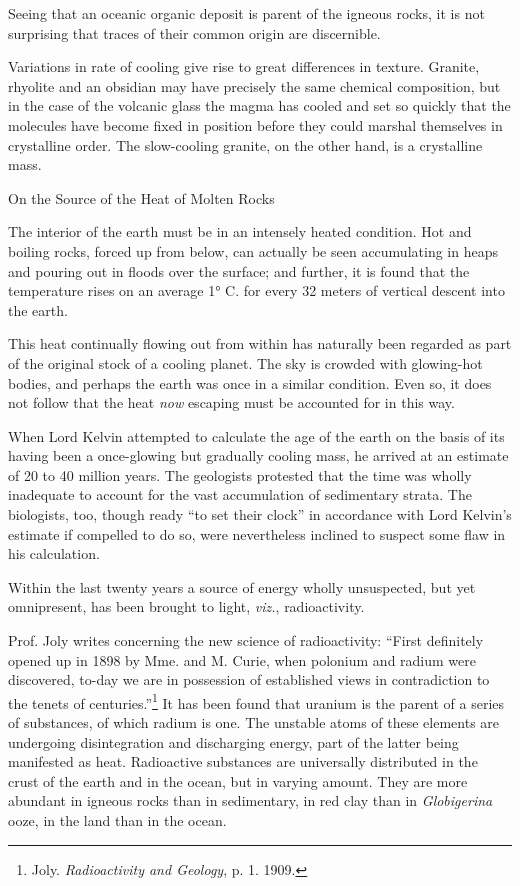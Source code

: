 \documentclass[a4paper, 12pt, oneside]{article}
\begin{document}
Seeing that an oceanic organic deposit is parent of the igneous rocks, it is not surprising that traces of their common origin are discernible.

Variations in rate of cooling give rise to great differences in texture. Granite, rhyolite and an obsidian may have precisely the same chemical composition, but in the case of the volcanic glass the magma has cooled and set so quickly that the molecules have become fixed in position before they could marshal themselves in crystalline order. The slow-cooling granite, on the other hand, is a crystalline mass.

On the Source of the Heat of Molten Rocks

The interior of the earth must be in an intensely heated condition. Hot and boiling rocks, forced up from below, can actually be seen accumulating in heaps and pouring out in floods over the surface; and further, it is found that the temperature rises on an average 1° C. for every 32 meters of vertical descent into the earth.

This heat continually flowing out from within has naturally been regarded as part of the original stock of a cooling planet. The sky is crowded with glowing-hot bodies, and perhaps the earth was once in a similar condition. Even so, it does not follow that the heat \emph{now} escaping must be accounted for in this way.

When Lord Kelvin attempted to calculate the age of the earth on the basis of its having been a once-glowing but gradually cooling mass, he arrived at an estimate of 20 to 40 million years. The geologists protested that the time was wholly inadequate to account for the vast accumulation of sedimentary strata. The biologists, too, though ready ``to set their clock'' in accordance with Lord Kelvin's estimate if compelled to do so, were nevertheless inclined to suspect some flaw in his calculation.

Within the last twenty years a source of energy wholly unsuspected, but yet omnipresent, has been brought to light, \emph{viz.}, radioactivity.

Prof. Joly writes concerning the new science of radioactivity: ``First definitely opened up in 1898 by Mme. and M. Curie, when polonium and radium were discovered, to-day we are in possession of established views in contradiction to the tenets of centuries.''\footnote{Joly. \emph{Radioactivity and Geology}, p. 1. 1909.} It has been found that uranium is the parent of a series of substances, of which radium is one. The unstable atoms of these elements are undergoing disintegration and discharging energy, part of the latter being manifested as heat. Radioactive substances are universally distributed in the crust of the earth and in the ocean, but in varying amount. They are more abundant in igneous rocks than in sedimentary, in red clay than in \emph{Globigerina} ooze, in the land than in the ocean.
\end{document}
